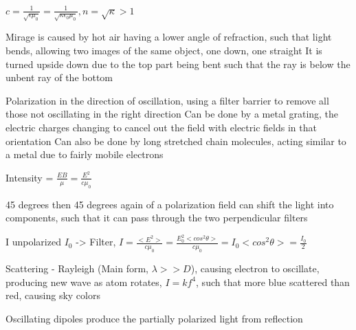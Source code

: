 \documentclass[11 pt, twoside]{article}
\begin{document}
$c = \frac{1}{\sqrt{\epsilon \mu_0}} = \frac{1}{\sqrt{\kappa \epsilon_0 \mu_0}}, n = \sqrt{\kappa} > 1$

Mirage is caused by hot air having a lower angle of refraction, such that light bends, allowing two images of the same object, one down, one straight
It is turned upside down due to the top part being bent such that the ray is below the unbent ray of the bottom

Polarization in the direction of oscillation, using a filter barrier to remove all those not oscillating in the right direction
Can be done by a metal grating, the electric charges changing to cancel out the field with electric fields in that orientation
Can also be done by long stretched chain molecules, acting similar to a metal due to fairly mobile electrons

Intensity = $\frac{EB}{\mu} = \frac{E^2}{c\mu_0}$

45 degrees then 45 degrees again of a polarization field can shift the light into components, such that it can pass through the two perpendicular filters

I unpolarized $I_0$ -> Filter, $I = \frac{<E^2>}{c\mu_0} = \frac{E_0^2<cos^2\theta>}{c\mu_0} = I_0<cos^2\theta> = \frac{I_0}{2}$

Scattering - Rayleigh (Main form, $\lambda >> D$), causing electron to oscillate, producing new wave as atom rotates, $I = kf^4$, such that more blue scattered than red, causing sky colors

Oscillating dipoles produce the partially polarized light from reflection
\end{document}
